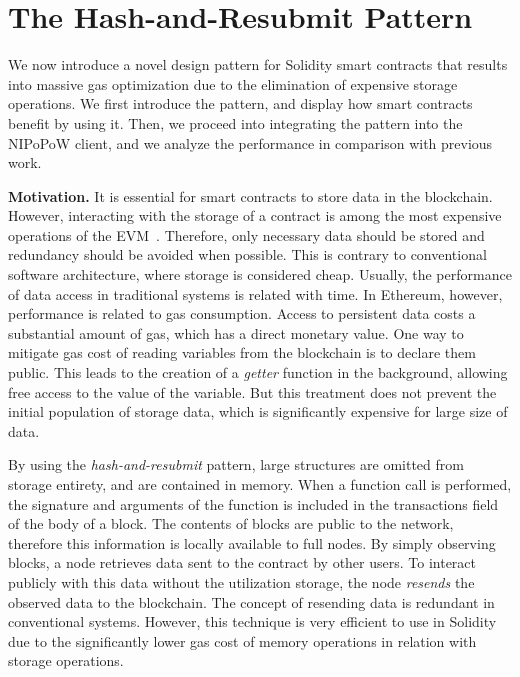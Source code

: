 \section{The Hash-and-Resubmit Pattern}

We now introduce a novel design pattern for Solidity smart contracts that
results into massive gas optimization due to the elimination of expensive
storage operations. We first introduce the pattern, and display how smart
contracts benefit by using it. Then, we proceed into integrating the pattern
into the NIPoPoW client, and we analyze the performance in comparison with
previous work.

\textbf{Motivation.}
It is essential for smart contracts to store data in the blockchain. However,
interacting with the storage of a contract is among the most expensive
operations of the EVM~\cite{wood, buterin}. Therefore, only necessary data
should be stored and redundancy should be avoided when possible. This is
contrary to conventional software architecture, where storage is considered
cheap. Usually, the performance of data access in traditional systems is
related with time. In Ethereum, however, performance is related to gas
consumption. Access to persistent data costs a substantial amount of gas, which
has a direct monetary value. One way to mitigate gas cost of reading variables
from the blockchain is to declare them public.  This leads to the creation of a
\emph{getter} function in the background, allowing free access to the value of
the variable. But this treatment does not prevent the initial population of
storage data, which is significantly expensive for large size of data.

By using the \emph{hash-and-resubmit} pattern, large structures are omitted
from storage entirety, and are contained in memory. When a function call is
performed, the signature and arguments of the function is included in the
transactions field of the body of a block. The contents of blocks are public to
the network, therefore this information is locally available to full nodes. By
simply observing blocks, a node retrieves data sent to the contract by other
users. To interact publicly with this data without the utilization storage, the
node \emph{resends} the observed data to the blockchain. The concept of
resending data is redundant in conventional systems. However, this technique
is very efficient to use in Solidity due to the significantly lower gas cost
of memory operations in relation with storage operations.


